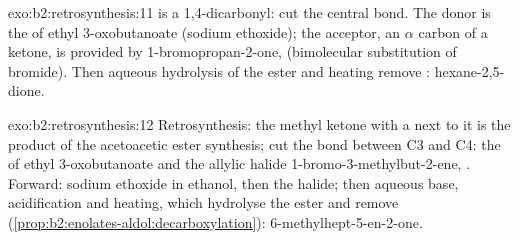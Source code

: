 \begin{solution}{exo:b2:retrosynthesis:11}
 is a 1,4-dicarbonyl: cut the central  bond. The donor is the  of
ethyl 3-oxobutanoate (sodium ethoxide); the acceptor, an $\alpha$ carbon of a ketone, is provided by
1-bromopropan-2-one,  (bimolecular substitution of bromide). Then aqueous hydrolysis of
the ester and heating remove : hexane-2,5-dione.
\end{solution}

\begin{solution}{exo:b2:retrosynthesis:12}
Retrosynthesis: the methyl ketone with a  next to it is the product of the acetoacetic ester
synthesis; cut the bond between C3 and C4: the  of ethyl 3-oxobutanoate and the allylic halide
1-bromo-3-methylbut-2-ene, . Forward: sodium ethoxide in ethanol, then the halide;
then aqueous base, acidification and heating, which hydrolyse the ester and remove 
(\cref{prop:b2:enolates-aldol:decarboxylation}): 6-methylhept-5-en-2-one.
\end{solution}

